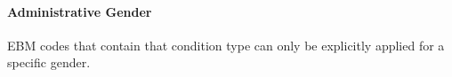 \paragraph{Administrative Gender}\label{par:administrative-gender}
EBM codes that contain that condition type can only be explicitly applied for a specific gender.

%

